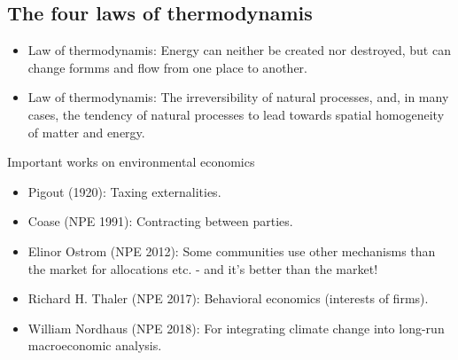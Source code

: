 \begin{multicols}{2}
 \subsection{The four laws of thermodynamis}
 \begin{itemize}
  \item[\nth{1}] Law of thermodynamis: Energy can neither be created nor destroyed, but can change formms and flow from one place to another.
  \item[\nth{2}] Law of thermodynamis: The irreversibility of natural processes, and, in many cases, the tendency of natural processes to lead towards spatial homogeneity of matter and energy.
 \end{itemize}
 \noindent
 Important works on environmental economics
 \begin{itemize}
  \item Pigout (1920): Taxing externalities.
  \item Coase (NPE 1991): Contracting between parties.
  \item Elinor Ostrom (NPE 2012): Some communities use other mechanisms than the market for allocations etc. - and it's better than the market!
  \item Richard H. Thaler (NPE 2017): Behavioral economics (interests of firms).
  \item William Nordhaus (NPE 2018): For integrating climate change into long-run macroeconomic analysis.
 \end{itemize}

\end{multicols}
